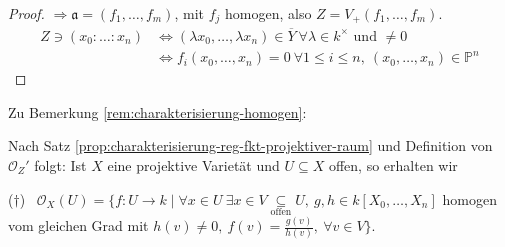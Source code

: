 \begin{proof}
  $\Rightarrow\mathfrak{a}=(f_{1},\ldots,f_{m})$, mit $f_{j}$ homogen, also $Z=V_{+}(f_{1},\ldots,f_{m})$. 
  \begin{align*}
    Z\ni(x_{0}:\ldots:x_{n}) & \Leftrightarrow(\lambda x_{0},\ldots,\lambda x_{n})\in\overline{Y}\ \forall\lambda\in k^{\times}\text{ und }\neq0\\
                             & \Leftrightarrow f_{i}(x_{0},\ldots,x_{n})=0\ \forall1\leq i\leq n,\ (x_{0},\ldots,x_{n})\in\mathbb{P}^{n}
  \end{align*}

\end{proof}
Zu Bemerkung \ref{rem:charakterisierung-homogen}:

Nach Satz \ref{prop:charakterisierung-reg-fkt-projektiver-raum} und Definition von $\mathcal{O}_{Z}'$ folgt: Ist $X$
eine projektive Varietät und $U\subseteq X$ offen, so erhalten wir 

($\dagger$) \ $\mathcal{O}_{X}(U)=\{f:U\rightarrow k\mid\forall x\in U\ \exists x\in V\underset{\text{offen}}{\subseteq}U,\ g,h\in k[X_{0},\ldots,X_{n}]$
homogen vom gleichen Grad mit $h(v)\neq0, \ f(v)=\frac{g(v)}{h(v)},\ \forall v\in V\}$.

